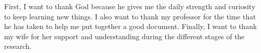 \begin{acknowledgements}
   First, I want to thank God because he gives me the daily strength and curiosity to keep learning new things. I also want to thank my professor for the time that he has taken to help me put together a good document.  Finally, I want to thank my wife for her support and understanding during the different stages of the research.
\end{acknowledgements}